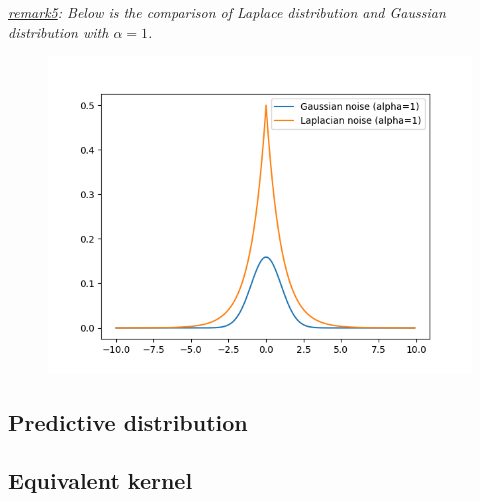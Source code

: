 \documentclass{article}
\begin{document}
	\textit{\underline{remark5}: Below is the comparison of Laplace distribution and Gaussian distribution with $\alpha=1$.}
	\begin{figure}[!htbp]
	\begin{center}
	\includegraphics[scale=.4]{C4-1.png}	
	\end{center}
	\end{figure}
	
	\subsection{Predictive distribution}
	
	\subsection{Equivalent kernel}
\end{document}
